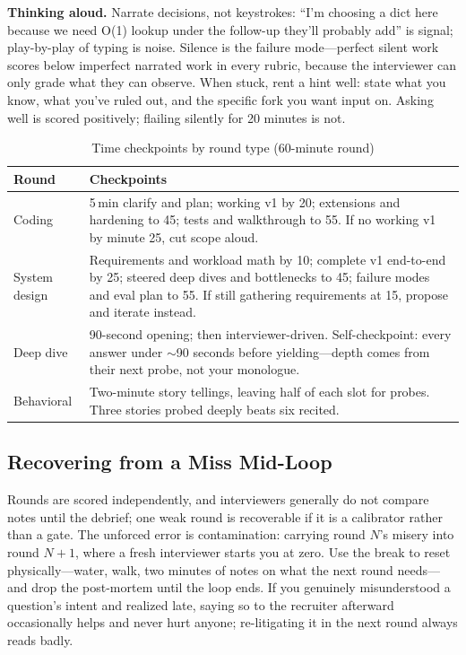 \textbf{Thinking aloud.} Narrate decisions, not keystrokes: ``I'm choosing a dict here because we need O(1) lookup under the follow-up they'll probably add'' is signal; play-by-play of typing is noise. Silence is the failure mode---perfect silent work scores below imperfect narrated work in every rubric, because the interviewer can only grade what they can observe. When stuck, rent a hint well: state what you know, what you've ruled out, and the specific fork you want input on. Asking well is scored positively; flailing silently for 20 minutes is not.

\begin{table}[H]
\centering
\small
\caption{Time checkpoints by round type (60-minute round)}
\label{tab:time_checkpoints}
\begin{tabularx}{\textwidth}{lX}
\toprule
\textbf{Round} & \textbf{Checkpoints} \\
\midrule
Coding & 5\,min clarify and plan; working v1 by 20; extensions and hardening to 45; tests and walkthrough to 55. If no working v1 by minute 25, cut scope aloud. \\
System design & Requirements and workload math by 10; complete v1 end-to-end by 25; steered deep dives and bottlenecks to 45; failure modes and eval plan to 55. If still gathering requirements at 15, propose and iterate instead. \\
Deep dive & 90-second opening; then interviewer-driven. Self-checkpoint: every answer under $\sim$90 seconds before yielding---depth comes from their next probe, not your monologue. \\
Behavioral & Two-minute story tellings, leaving half of each slot for probes. Three stories probed deeply beats six recited. \\
\bottomrule
\end{tabularx}
\end{table}

\subsection{Recovering from a Miss Mid-Loop}

Rounds are scored independently, and interviewers generally do not compare notes until the debrief; one weak round is recoverable if it is a calibrator rather than a gate. The unforced error is contamination: carrying round $N$'s misery into round $N{+}1$, where a fresh interviewer starts you at zero. Use the break to reset physically---water, walk, two minutes of notes on what the next round needs---and drop the post-mortem until the loop ends. If you genuinely misunderstood a question's intent and realized late, saying so to the recruiter afterward occasionally helps and never hurt anyone; re-litigating it in the next round always reads badly.

